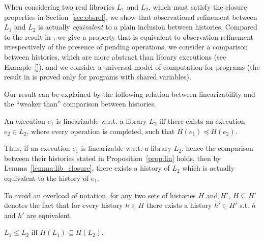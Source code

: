 When considering two real libraries $L_1$ and $L_2$, which must satisfy the closure 
properties in Section~\ref{sec:obsref}, we show that observational refinement between $L_1$ and $L_2$ is actually 
\emph{equivalent} to a plain inclusion between histories. Compared to the
result in \citet{journals/tcs/FilipovicORY10}, we give a property that is equivalent to observation refinement irrespectively of the
presence of pending operations, we consider a comparison between histories, which are more abstract 
than library executions (see Example~\ref{}), and we consider a universal model of computation for programs 
(the result in \citet{journals/tcs/FilipovicORY10} is proved only for programs with shared variables). 

Our result can be explained by the following relation between linearizability and the ``weaker than'' comparison between histories.

\begin{proposition}\label{prop:lin}
An execution $e_1$ is linearizable w.r.t. a library $L_2$ iff there exists an execution $e_2\in L_2$, where every operation is completed, 
such that $H(e_1)\preceq H(e_2)$.
\end{proposition}



Thus, if an execution $e_1$ is linearizable w.r.t. a library $L_2$, hence the comparison between their histories 
stated in Proposition~\ref{prop:lin} holds, then by Lemma~\ref{lemma:lib_closure}, 
there exists a history of $L_2$ which is actually equivalent to the history of $e_1$.

To avoid an overload of notation, for any two sets of histories $H$ and $H'$, $H\subseteq H'$ 
denotes the fact that for every history $h\in H$ there exists a history $h'\in H'$ s.t. 
$h$ and $h'$ are equivalent.

\begin{theorem}\label{th:equiv}

  $L_1 \leq L_2$ iff $H(L_1) \subseteq H(L_2)$.

\end{theorem}

